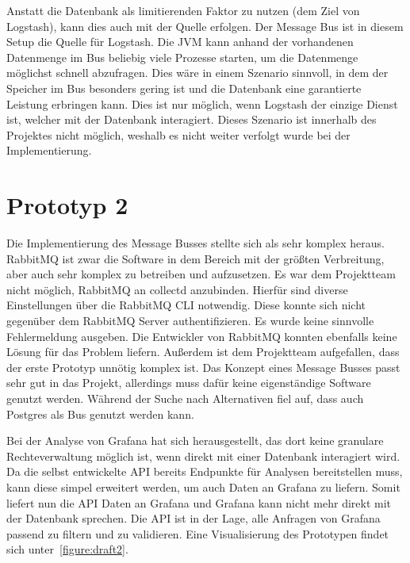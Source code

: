 Anstatt die Datenbank als limitierenden Faktor zu nutzen (dem Ziel von
Logstash), kann dies auch mit der Quelle erfolgen. Der Message Bus ist
in diesem Setup die Quelle für Logstash. Die \gls{JVM} kann anhand der
vorhandenen Datenmenge im Bus beliebig viele Prozesse starten, um die
Datenmenge möglichst schnell abzufragen. Dies wäre in einem Szenario sinnvoll,
in dem der Speicher im Bus besonders gering ist und die Datenbank eine
garantierte Leistung erbringen kann. Dies ist nur möglich, wenn Logstash der
einzige Dienst ist, welcher mit der Datenbank interagiert. Dieses Szenario ist
innerhalb des Projektes nicht möglich, weshalb es nicht weiter verfolgt wurde
bei der Implementierung.
\tm%


\section{Prototyp 2}
Die Implementierung des Message Busses stellte sich als sehr komplex heraus.
RabbitMQ ist zwar die Software in dem Bereich mit der größten Verbreitung, aber
auch sehr komplex zu betreiben und aufzusetzen. Es war dem Projektteam nicht
möglich, RabbitMQ an collectd anzubinden. Hierfür sind diverse Einstellungen
über die RabbitMQ \gls{CLI} notwendig. Diese konnte sich nicht gegenüber dem
RabbitMQ Server authentifizieren. Es wurde keine sinnvolle Fehlermeldung
ausgeben. Die Entwickler von RabbitMQ konnten ebenfalls keine Lösung für das
Problem liefern. Außerdem ist dem Projektteam aufgefallen, dass der erste
Prototyp unnötig komplex ist. Das Konzept eines Message Busses passt sehr gut
in das Projekt, allerdings muss dafür keine eigenständige Software genutzt
werden. Während der Suche nach Alternativen fiel auf, dass auch Postgres als
Bus genutzt werden kann.

Bei der Analyse von Grafana hat sich herausgestellt, das dort keine granulare
Rechteverwaltung möglich ist, wenn direkt mit einer Datenbank interagiert wird.
Da die selbst entwickelte \gls{API} bereits Endpunkte für Analysen
bereitstellen muss, kann diese simpel erweitert werden, um auch Daten an
Grafana zu liefern. Somit liefert nun die \gls{API} Daten an Grafana und
Grafana kann nicht mehr direkt mit der Datenbank sprechen. Die \gls{API} ist in
der Lage, alle Anfragen von Grafana passend zu filtern und zu validieren. Eine
Visualisierung des Prototypen findet sich unter~\ref{figure:draft2}.
\tm%

